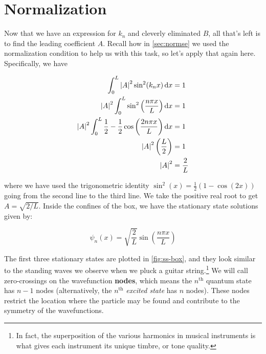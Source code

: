 \section{Normalization}

Now that we have an expression for $k_n$ and cleverly eliminated $B$, all that's left is to find the leading coefficient $A$. 
Recall how in \autoref{sec:normse} we used the normalization condition to help us with this task, so let's apply that again here. 
Specifically, we have

\begin{align*}
	\int_0^L \abs{A}^2 \sin^2(k_nx)\dd{x} &= 1 \\
	\abs{A}^2 \int_0^L \sin^2\left(\frac{n\pi x}{L}\right)\dd{x} &= 1 \\ 
	\abs{A}^2 \int_0^L \frac{1}{2} - \frac{1}{2}\cos\left(\frac{2n\pi x}{L}\right)\dd{x} &= 1 \\
	\abs{A}^2 \left(\frac{L}{2}\right) &= 1 \\
	\abs{A}^2 &= \frac{2}{L}
\end{align*}

\noindent where we have used the trigonometric identity $\sin^2(x) = \frac{1}{2} \left( 1 - \cos(2x) \right)$ going from the second line to the third line. 
We take the positive real root to get $A = \sqrt{2/L}$. 
Inside the confines of the box, we have the stationary state solutions given by:

\begin{tcolorbox}[title=Stationary state solutions] \vspace{-2ex}
	\begin{equation}
		\psi_n(x) = \sqrt{\frac{2}{L}} \sin \left(\frac{n\pi x}{L}\right) \label{eq:box-ss}
	\end{equation}
\end{tcolorbox}

The first three stationary states are plotted in \autoref{fig:ss-box}, and they look similar to the standing waves we observe when we pluck a guitar string.\footnote{In fact, the superposition of the various harmonics in musical instruments is what gives each instrument its unique timbre, or tone quality.} 
We will call zero-crossings on the wavefunction \textbf{nodes}, which means the $n^{\text{th}}$ quantum state has $n - 1$ nodes (alternatively, the $n^{\text{th}}$ \emph{excited state} has $n$ nodes). 
These nodes restrict the location where the particle may be found and contribute to the symmetry of the wavefunctions.

